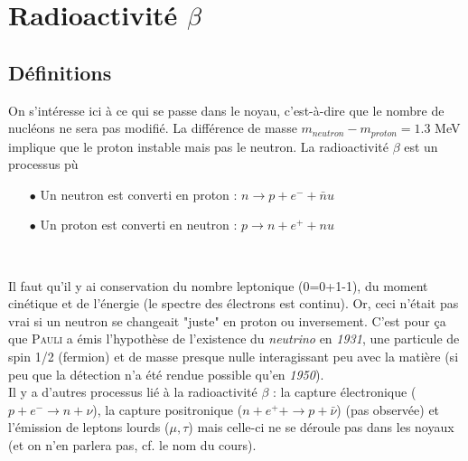 \chapter{Radioactivité $\beta$}
\section{Définitions}
On s'intéresse ici à ce qui se passe dans le noyau, c'est-à-dire que le nombre de nucléons ne sera pas modifié. La
différence de masse $m_{neutron}-m_{proton} = 1.3$ MeV implique que le proton instable mais pas le neutron. La 
radioactivité $\beta$ est un processus pù
\begin{itemize}
\item[$\bullet$] Un neutron est converti en proton : $n\to p+e^-+\bar nu$
\item[$\bullet$] Un proton est converti en neutron : $p\to n+e^++ nu$
\end{itemize}\ 

Il faut qu'il y ai conservation du nombre leptonique (0=0+1-1), du moment cinétique et de l'énergie (le spectre
des électrons est continu). Or, ceci n'était pas vrai si un neutron se changeait "juste" en proton ou inversement. 
C'est pour ça que \textsc{Pauli} a émis l'hypothèse de l'existence du \textit{neutrino} en \textit{1931}, une
particule de spin 1/2 (fermion) et de masse presque nulle interagissant peu avec la matière (si peu que la détection
n'a été rendue possible qu'en \textit{1950}).\\

Il y a d'autres processus lié à la radioactivité $\beta$ : la capture électronique ($p+e^-\to n+\nu$), la 
capture positronique ($n+e^++\to p+\bar\nu$) (pas observée) et l'émission de leptons lourds ($\mu, \tau$) mais 
celle-ci ne se déroule pas dans les noyaux (et on n'en parlera pas, cf. le nom du cours).

